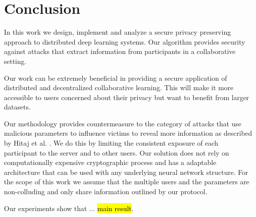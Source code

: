 \documentclass[conference]{IEEEtran}
\begin{document}
\section{Conclusion}

In this work we design, implement and analyze a secure privacy preserving approach to distributed deep learning systems.  Our
algorithm provides security against attacks that extract information from participants in a collaborative setting. 

Our work can be extremely beneficial in providing a secure application of distributed and decentralized collaborative learning. This
will make it more accessible to users concerned about their privacy but want to benefit from larger datasets.

Our methodology provides countermeasure to the category of attacks that use malicious parameters to influence victims to reveal more
information as described  by Hitaj  et al. \cite{hitaj2017deep} . We do this by limiting the consistent exposure of each participant to
the server and to other users. Our solution does not rely on computationally expensive cryptographic process and has a adaptable
architecture that can be used with any underlying neural network structure. For the scope of this work we assume that the multiple
users and the parameters are non-colluding and only share information outlined by our protocol. 

Our experiments show that ... \hl{main result}. 


\end{document}
